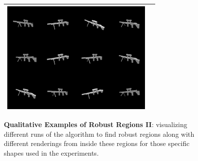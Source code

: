 \begin{figure}[h]
\begin{tabular}{c|c}
  \includegraphics[width = 7.5cm]{supimages/qualitative/rifle/rifle_s.png}\\ \hline 
\end{tabular}
   \caption{\small \textbf{Qualitative Examples of Robust Regions II}: visualizing different runs of the algorithm to find robust regions along with different renderings from inside these regions for those specific shapes used in the experiments.}
   \vspace{-8pt}
   \label{fig:ex2}
\end{figure}




